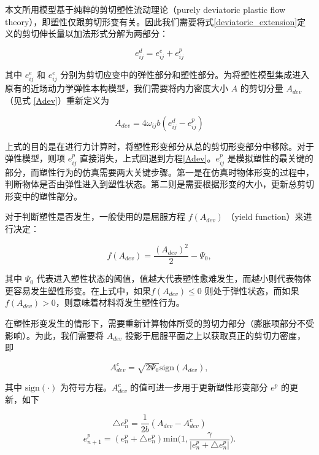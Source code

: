 本文所用模型基于纯粹的剪切塑性流动理论（purely deviatoric plastic flow theory），即塑性仅跟剪切形变有关。因此我们需要将式\ref{deviatoric_extension}定义的剪切伸长量以加法形式分解为两部分：

\begin{equation}
e_{ij}^d = e_{ij}^e+e_{ij}^p
\end{equation}

其中 $e_{ij}^e$ 和 $e_{ij}^e$ 分别为剪切应变中的弹性部分和塑性部分。为将塑性模型集成进入原有的近场动力学弹性本构模型，我们需要将内力密度大小 $A$ 的剪切分量 $A_{dev}$（见式 \ref{Adev}）重新定义为

\begin{equation}
A_{dev} = 4\omega_{ij}b(e_{ij}^d-e_{ij}^p)
\end{equation}

上式的目的是在进行力计算时，将塑性形变部分从总的剪切形变部分中移除。对于弹性模型，则项 $e_{ij}^p$ 直接消失，上式回退到方程\ref{Adev}。$e_{ij}^p$ 是模拟塑性的最关键的部分，而塑性行为的仿真需要两大关键步骤。第一是在仿真时物体形变的过程中，判断物体是否由弹性进入到塑性状态。第二则是需要根据形变的大小，更新总剪切形变中的塑性部分。

对于判断塑性是否发生，一般使用的是屈服方程 $f(A_{dev})$ （yield function）来进行决定：

\begin{equation}
f(A_{dev}) = \frac{(A_{dev})^2}{2}-\Psi_0,
\end{equation}

其中 $\Psi_0$ 代表进入塑性状态的阈值，值越大代表塑性愈难发生，而越小则代表物体更容易发生塑性形变。在上式中，如果$f(A_{dev})\leq 0$ 则处于弹性状态，而如果 $f(A_{dev}) > 0$，则意味着材料将发生塑性行为。

在塑性形变发生的情形下，需要重新计算物体所受的剪切力部分（膨胀项部分不受影响）。为此，我们需要将 $A_{dev}$ 投影于屈服平面之上以获取真正的剪切力密度，即

\begin{equation}
A_{dev}^c=\sqrt{2\Psi_0}\mathrm{sign}(A_{dev}),
\end{equation}

其中 $\mathrm{sign}(\cdot)$ 为符号方程。$A_{dev}^c$ 的值可进一步用于更新塑性形变部分 $e^p$ 的更新，如下

\begin{equation}
\triangle e_n^p = \frac{1}{2b}(A_{dev}-A_{dev}^c)
\end{equation}
\begin{equation}
e_{n+1}^p = (e_n^p+\triangle e_n^p)\mathrm{min}\big(1,\frac{\gamma}{|e_n^p+\triangle e_n^p|}\big).
\end{equation}

